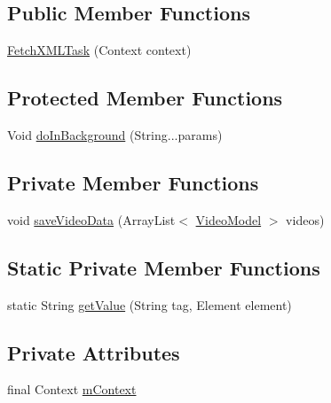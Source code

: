 \subsection*{Public Member Functions}
\begin{DoxyCompactItemize}
\item 
\hyperlink{classorg_1_1buildmlearn_1_1toolkit_1_1videocollectiontemplate_1_1data_1_1FetchXMLTask_a2e07a9ef7bf56e0f8b27e1e89e982c77}{Fetch\+X\+M\+L\+Task} (Context context)
\end{DoxyCompactItemize}
\subsection*{Protected Member Functions}
\begin{DoxyCompactItemize}
\item 
Void \hyperlink{classorg_1_1buildmlearn_1_1toolkit_1_1videocollectiontemplate_1_1data_1_1FetchXMLTask_af8604628df86423490d5d8eb31aa0bd9}{do\+In\+Background} (String...\+params)
\end{DoxyCompactItemize}
\subsection*{Private Member Functions}
\begin{DoxyCompactItemize}
\item 
void \hyperlink{classorg_1_1buildmlearn_1_1toolkit_1_1videocollectiontemplate_1_1data_1_1FetchXMLTask_a90ba6986279bbfb3eb7b2e202991c4fd}{save\+Video\+Data} (Array\+List$<$ \hyperlink{classorg_1_1buildmlearn_1_1toolkit_1_1videocollectiontemplate_1_1data_1_1VideoModel}{Video\+Model} $>$ videos)
\end{DoxyCompactItemize}
\subsection*{Static Private Member Functions}
\begin{DoxyCompactItemize}
\item 
static String \hyperlink{classorg_1_1buildmlearn_1_1toolkit_1_1videocollectiontemplate_1_1data_1_1FetchXMLTask_a9b6046221384a11df85fc7adef1a3a81}{get\+Value} (String tag, Element element)
\end{DoxyCompactItemize}
\subsection*{Private Attributes}
\begin{DoxyCompactItemize}
\item 
final Context \hyperlink{classorg_1_1buildmlearn_1_1toolkit_1_1videocollectiontemplate_1_1data_1_1FetchXMLTask_a4c1eddd2f218ac8f8298a88f43fa95fa}{m\+Context}
\end{DoxyCompactItemize}


